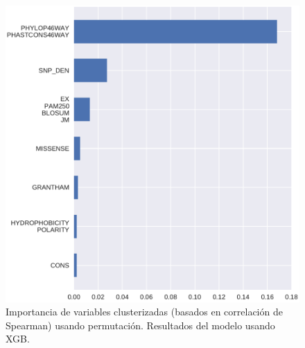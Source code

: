 \begin{figure}[H]
    \centering
    \includegraphics[scale=0.6]{documents/latex/figures/3/integral/integral_importance_cluster_xgb.pdf}
    \caption{Importancia de variables clusterizadas (basados en correlación de Spearman) usando permutación. Resultados del modelo usando XGB.}
    \label{fig:importance_cluster_integral_xgb}
\end{figure}


\newpage

